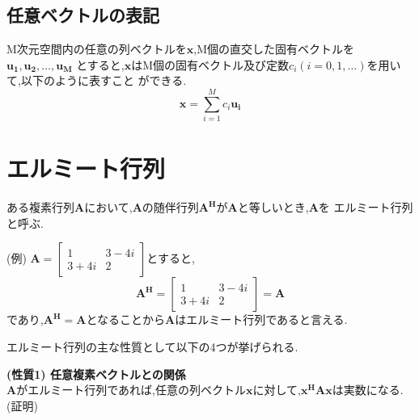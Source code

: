 \subsection{任意ベクトルの表記}
M次元空間内の任意の列ベクトルを$\bm{x}$,M個の直交した固有ベクトルを$\bm{u_1},\bm{u_2},\ldots,\bm{u_M}$
とすると,$\bm{x}$はM個の固有ベクトル及び定数$c_i(i=0,1,\ldots)$を用いて,以下のように表すこと
ができる.
\begin{equation}
    \bm{x} = \sum_{i=1}^M c_i\bm{u_i}
\end{equation}

\section{エルミート行列}
ある複素行列$\bm{A}$において,$\bm{A}$の随伴行列$\bm{A^H}$が$\bm{A}$と等しいとき,$\bm{A}$を
エルミート行列と呼ぶ.

(例) \quad
$
  \bm{A} = \left[
    \begin{array}{cc}
      1 & 3-4i \\
      3+4i & 2
    \end{array}
  \right]
$とすると,
\vspace{1mm}
\begin{equation}
    \bm{A^H} = \left[
        \begin{array}{cc}
            1 & 3-4i \\
            3+4i & 2
        \end{array}
    \right]
    = \bm{A} \nonumber
\end{equation}
であり,$\bm{A^H}=\bm{A}$となることから$\bm{A}$はエルミート行列であると言える.

エルミート行列の主な性質として以下の4つが挙げられる.

\vspace{5mm}
\noindent\textbf{(性質1) \quad 任意複素ベクトルとの関係} \\
$\bm{A}$がエルミート行列であれば,任意の列ベクトル$\bm{x}$に対して,$\bm{x^HAx}$は実数になる.\\
\vspace{3mm}
(証明)


